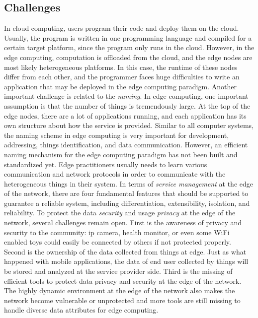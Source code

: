 \subsection{Challenges}
In cloud computing, users program their code and deploy them on the cloud. Usually, the program is written in one programming language and compiled for a certain target platform, since the program only runs in the cloud. However, in the edge computing, computation is offloaded from the cloud, and the edge nodes are most likely heterogeneous platforms. In this case, the runtime of these nodes differ from each other, and the programmer faces huge difficulties to write an application that may be deployed in the edge computing paradigm.
Another important challenge is related to the \textit{naming}. In edge computing, one important assumption is that the number of things is tremendously large. At the top of the edge nodes, there are a lot of applications running, and each application has its own structure about how the service is provided. Similar to all computer systems, the naming scheme in edge computing is very important for development, addressing, things identification, and data communication. However, an efficient naming mechanism for the edge computing paradigm has not been built and standardized yet. Edge practitioners usually needs to learn various communication and network protocols in order to communicate with the heterogeneous things in their system.
In terms of \textit{service management} at the edge of the network, there are four fundamental features that should be supported to guarantee a reliable system, including differentiation, extensibility, isolation, and reliability.  
To protect the data \textit{security} and usage \textit{privacy} at the edge of the network, several challenges remain open. First is the awareness of privacy and security to the community: ip camera, health monitor, or even some WiFi enabled toys could easily be connected by others if not protected properly. Second is the ownership of the data collected from things at edge. Just as what happened with mobile applications, the data of end user collected by things will be stored and analyzed at the service provider side. Third is the missing of efficient tools to protect data privacy and security at the edge of the network. The highly dynamic environment at the edge of the network also makes the network become vulnerable or unprotected and more tools are still missing to handle diverse data attributes for edge computing.


